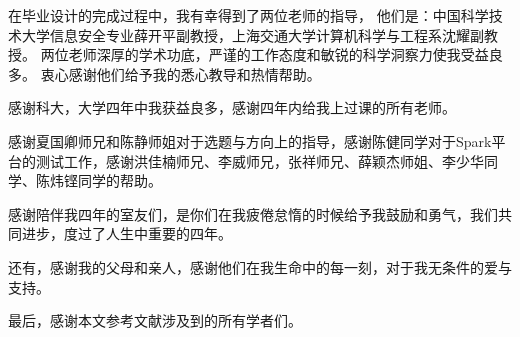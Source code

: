 \begin{acknowledgements}

在毕业设计的完成过程中，我有幸得到了两位老师的指导，
他们是：中国科学技术大学信息安全专业薛开平副教授，上海交通大学计算机科学与工程系沈耀副教授。
两位老师深厚的学术功底，严谨的工作态度和敏锐的科学洞察力使我受益良多。
衷心感谢他们给予我的悉心教导和热情帮助。

感谢科大，大学四年中我获益良多，感谢四年内给我上过课的所有老师。

感谢夏国卿师兄和陈静师姐对于选题与方向上的指导，感谢陈健同学对于Spark平台的测试工作，感谢洪佳楠师兄、李威师兄，张祥师兄、薛颖杰师姐、李少华同学、陈炜铿同学的帮助。

感谢陪伴我四年的室友们，是你们在我疲倦怠惰的时候给予我鼓励和勇气，我们共同进步，度过了人生中重要的四年。

还有，感谢我的父母和亲人，感谢他们在我生命中的每一刻，对于我无条件的爱与支持。

最后，感谢本文参考文献涉及到的所有学者们。

\end{acknowledgements}
